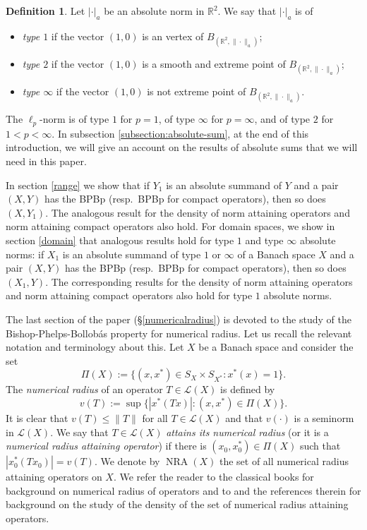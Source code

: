 \documentclass[10pt,a4paper]{amsart}
\theoremstyle{plain}
\theoremstyle{definition}
\newtheorem{definition}[theorem]{Definition}
\newcommand{\R}{\mathbb{R}}
\DeclareMathOperator{\NRA}{NRA}
\renewcommand{\leq}{\leqslant}
\begin{document}
\begin{definition} Let $| \cdot |_a$ be an absolute norm in $\R^2$. We say that $| \cdot |_a$ is of
	\begin{itemize}
		\item[(i)] {\it type $1$} if the vector $(1, 0)$ is an vertex of $B_{(\R^2,\|\cdot\|_a)}$;
		\item[(ii)] {\it type $2$} if the vector $(1, 0)$ is a smooth and extreme point of $B_{(\R^2,\|\cdot\|_a)}$;
		\item[(iii)] {\it type $\infty$} if the vector $(1, 0)$ is not extreme point of $B_{(\R^2,\|\cdot\|_a)}$.
	\end{itemize}
\end{definition}
The $\ell_p$-norm is of type $1$ for $p=1$, of type $\infty$ for $p=\infty$, and of type $2$ for $1<p<\infty$. In subsection \ref{subsection:absolute-sum}, at the end of this introduction, we will give an account on the results of absolute sums that we will need in this paper.

In section \ref{range} we show that if $Y_1$ is an absolute summand of $Y$ and a pair $(X,Y)$ has the BPBp (resp.\ BPBp for compact operators), then so does $(X,Y_1)$. The analogous result for the density of norm attaining operators and norm attaining compact operators also hold. For domain spaces, we show in section \ref{domain} that analogous results hold for type $1$ and type $\infty$ absolute norms: if $X_1$ is an absolute summand of type $1$ or $\infty$ of a Banach space $X$ and a pair $(X,Y)$ has the BPBp (resp.\ BPBp for compact operators), then so does $(X_1,Y)$. The corresponding results for the density of norm attaining operators and norm attaining compact operators also hold for type $1$ absolute norms.



The last section of the paper (\S \ref{numericalradius}) is devoted to the study of the Bishop-Phelps-Bollob\'{a}s property for numerical radius. Let us recall the relevant notation and terminology about this. Let $X$ be a Banach space and consider the set
\begin{equation*}
\Pi(X) := \{ (x, x^*) \in S_X \times S_{X^*}\colon x^*(x) = 1 \}.	
\end{equation*}
The {\it numerical radius} of an operator $T \in \mathcal{L}(X)$ is defined by
\begin{equation*}
v(T) := \sup \{ |x^*(Tx)|\colon (x, x^*) \in \Pi(X) \}.	
\end{equation*}
It is clear that $v(T) \leq \|T\|$ for all $T \in \mathcal{L}(X)$ and that $v(\cdot)$ is a seminorm in $\mathcal{L}(X)$. We say that $T \in \mathcal{L}(X)$ {\it attains its numerical radius} (or it is a {\it numerical radius attaining operator}) if there is $(x_0, x_0^*) \in \Pi(X)$ such that $|x_0^*(Tx_0)| = v(T)$. We denote by $\NRA(X)$ the set of all numerical radius attaining operators on $X$.
We refer the reader to the classical books \cite{Bonsall0,Bonsall1} for background on numerical radius of operators and to \cite{Acosta-RACSAM,CapMM,Paya1} and the references therein for background on the study of the density of the set of numerical radius attaining operators.
\end{document}

